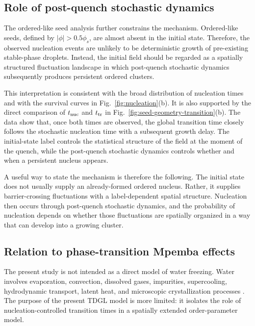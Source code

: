 ﻿\documentclass[aps,pre,preprint,showkeys,amsmath,amssymb,superscriptaddress,longbibliography]{revtex4-2}
\begin{document}
\subsection{Role of post-quench stochastic dynamics}\label{role-of-post-quench-stochastic-dynamics}

The ordered-like seed analysis further constrains the mechanism. Ordered-like seeds, defined by $|\phi|>0.5\phi_s$, are almost absent in the initial state. Therefore, the observed nucleation events are unlikely to be deterministic growth of pre-existing stable-phase droplets. Instead, the initial field should be regarded as a spatially structured fluctuation landscape in which post-quench stochastic dynamics subsequently produces persistent ordered clusters.

This interpretation is consistent with the broad distribution of nucleation times and with the survival curves in Fig.~\ref{fig:nucleation}(b). It is also supported by the direct comparison of $t_{\rm nuc}$ and $t_{\rm tr}$ in Fig.~\ref{fig:seed-geometry-transition}(b). The data show that, once both times are observed, the global transition time closely follows the stochastic nucleation time with a subsequent growth delay. The initial-state label controls the statistical structure of the field at the moment of the quench, while the post-quench stochastic dynamics controls whether and when a persistent nucleus appears.

A useful way to state the mechanism is therefore the following. The initial state does not usually supply an already-formed ordered nucleus. Rather, it supplies barrier-crossing fluctuations with a label-dependent spatial structure. Nucleation then occurs through post-quench stochastic dynamics, and the probability of nucleation depends on whether those fluctuations are spatially organized in a way that can develop into a growing cluster.

\subsection{Relation to phase-transition Mpemba effects}\label{relation-to-phase-transition-mpemba-effects}

The present study is not intended as a direct model of water freezing. Water involves evaporation, convection, dissolved gases, impurities, supercooling, hydrodynamic transport, latent heat, and microscopic crystallization processes \cite{Jeng2006,Auerbach1995,Burridge2016}. The purpose of the present TDGL model is more limited: it isolates the role of nucleation-controlled transition times in a spatially extended order-parameter model.
\end{document}
